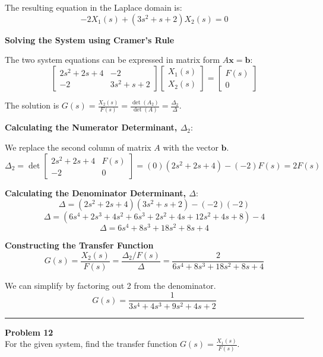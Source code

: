 \documentclass[11pt]{article}
\begin{document}
The resulting equation in the Laplace domain is:
\begin{equation}
-2X_1(s) + (3s^2 + s + 2)X_2(s) = 0 \tag{2}
\end{equation}

\newpage
\noindent\textbf{Solving the System using Cramer's Rule}
\vspace{12pt}

The two system equations can be expressed in matrix form $A\mathbf{x} = \mathbf{b}$:
$$
\begin{bmatrix}
2s^2 + 2s + 4 & -2 \\
-2 & 3s^2 + s + 2
\end{bmatrix}
\begin{bmatrix}
X_1(s) \\
X_2(s)
\end{bmatrix}
=
\begin{bmatrix}
F(s) \\
0
\end{bmatrix}
$$

The solution is $G(s) = \frac{X_2(s)}{F(s)} = \frac{\det(A_2)}{\det(A)} = \frac{\Delta_2}{\Delta}$.

\vspace{12pt}
\noindent\textbf{Calculating the Numerator Determinant, $\Delta_2$}:
\vspace{12pt}

We replace the second column of matrix $A$ with the vector $\mathbf{b}$.
$$ \Delta_2 = \det
\begin{bmatrix}
2s^2 + 2s + 4 & F(s) \\
-2 & 0
\end{bmatrix}
= (0)(2s^2 + 2s + 4) - (-2)F(s) = 2F(s) $$

\vspace{12pt}
\noindent\textbf{Calculating the Denominator Determinant, $\Delta$}:
$$\Delta = (2s^2 + 2s + 4)(3s^2 + s + 2) - (-2)(-2)$$
$$\Delta = (6s^4 + 2s^3 + 4s^2 + 6s^3 + 2s^2 + 4s + 12s^2 + 4s + 8) - 4$$
$$\Delta = 6s^4 + 8s^3 + 18s^2 + 8s + 4$$

\vspace{12pt}
\noindent\textbf{Constructing the Transfer Function}
$$G(s) = \frac{X_2(s)}{F(s)} = \frac{\Delta_2 / F(s)}{\Delta} = \frac{2}{6s^4 + 8s^3 + 18s^2 + 8s + 4}$$

We can simplify by factoring out 2 from the denominator.
\[
\boxed{
G(s) = \frac{1}{3s^4 + 4s^3 + 9s^2 + 4s + 2}
}
\]

\newpage
  \setcounter{page}{22}  
\noindent\rule{\textwidth}{1pt}
\noindent\textbf{Problem 12} \hfill 
\\ For the given system, find the transfer function $G(s)=\frac{X_1(s)}{F(s)}$.
\end{document}
